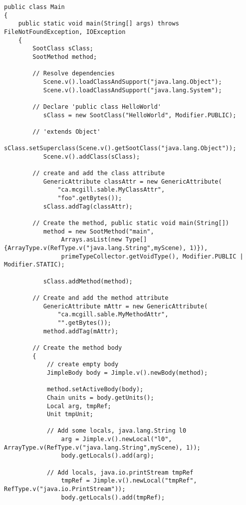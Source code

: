 \documentclass{article}
\begin{document}
\begin{verbatim}
public class Main
{
    public static void main(String[] args) throws FileNotFoundException, IOException
    {
        SootClass sClass;
        SootMethod method;
        
        // Resolve dependencies
           Scene.v().loadClassAndSupport("java.lang.Object");
           Scene.v().loadClassAndSupport("java.lang.System");
           
        // Declare 'public class HelloWorld'   
           sClass = new SootClass("HelloWorld", Modifier.PUBLIC);

        // 'extends Object'
           sClass.setSuperclass(Scene.v().getSootClass("java.lang.Object"));
           Scene.v().addClass(sClass);
           
        // create and add the class attribute
           GenericAttribute classAttr = new GenericAttribute(
               "ca.mcgill.sable.MyClassAttr", 
               "foo".getBytes());
           sClass.addTag(classAttr);
           
        // Create the method, public static void main(String[])
           method = new SootMethod("main",
                Arrays.asList(new Type[] {ArrayType.v(RefType.v("java.lang.String",myScene), 1)}),
                primeTypeCollector.getVoidType(), Modifier.PUBLIC | Modifier.STATIC);
        
           sClass.addMethod(method);

        // Create and add the method attribute
           GenericAttribute mAttr = new GenericAttribute(
               "ca.mcgill.sable.MyMethodAttr", 
               "".getBytes());
           method.addTag(mAttr);
           
        // Create the method body
        {
            // create empty body
            JimpleBody body = Jimple.v().newBody(method);
            
            method.setActiveBody(body);
            Chain units = body.getUnits();
            Local arg, tmpRef;
            Unit tmpUnit;
            
            // Add some locals, java.lang.String l0
                arg = Jimple.v().newLocal("l0", ArrayType.v(RefType.v("java.lang.String",myScene), 1));
                body.getLocals().add(arg);
            
            // Add locals, java.io.printStream tmpRef
                tmpRef = Jimple.v().newLocal("tmpRef", RefType.v("java.io.PrintStream"));
                body.getLocals().add(tmpRef);
                

\end{verbatim}
\end{document}
